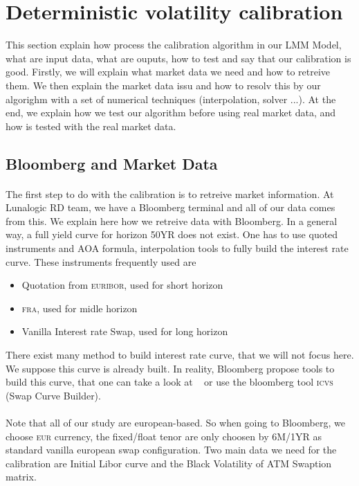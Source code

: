 \documentclass[a4paper,10pt]{article}
\newcommand{\bl}[1]{{\scshape  #1}}
\begin{document}
\section{Deterministic volatility calibration}
This section explain how process the calibration algorithm in our LMM Model, what are input data, what are ouputs, how to test and say that our calibration is good. Firstly, we will explain what market data we need and how to retreive them. We then explain the market data issu and how to resolv this by our algorighm with a set of numerical techniques (interpolation, solver ...). At the end, we explain how we test our algorithm before using real market data, and how is tested with the real market data.   
\subsection{Bloomberg and Market Data}
\paragraph{} The first step to do with the calibration is to retreive market information. At Lunalogic RD team, we have a Bloomberg terminal and all of our data comes from this. We explain here how we retreive data with Bloomberg. In a general way, a full yield curve for horizon 50YR does not exist. One has to use quoted instruments and AOA formula, interpolation tools to fully build the interest rate curve. These instruments frequently used are
\begin{itemize}
 \item Quotation from \bl{euribor}, used for short horizon
 \item \bl{fra}, used for midle horizon
 \item Vanilla Interest rate Swap, used for long horizon
\end{itemize}
There exist many method to build interest rate curve, that we will not focus here. We suppose this curve is already built. In reality, Bloomberg propose tools to build this curve, that one can take a look at ~\cite{BL2012} or use the bloomberg tool \bl{icvs} (Swap Curve Builder).
\paragraph{} Note that all of our study are european-based. So when going to Bloomberg, we choose \bl{eur} currency, the fixed/float tenor are only choosen by 6M/1YR as standard vanilla european swap configuration. Two main data we need for the calibration are Initial Libor curve and the Black Volatility of ATM Swaption matrix.   
\end{document}
